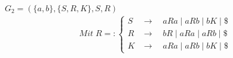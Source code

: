 $G_2=(\{a,b\},\{S,R,K\},S,R)$
\begin{align*}
	Mit\;R=:
	\begin{cases}
		S&\rightarrow\quad aRa\mid aRb\mid bK\mid\$\\
		R&\rightarrow\quad bR\mid aRa\mid aRb\mid\$\\
		K&\rightarrow\quad aRa\mid aRb\mid bK\mid\$
	\end{cases}
\end{align*}